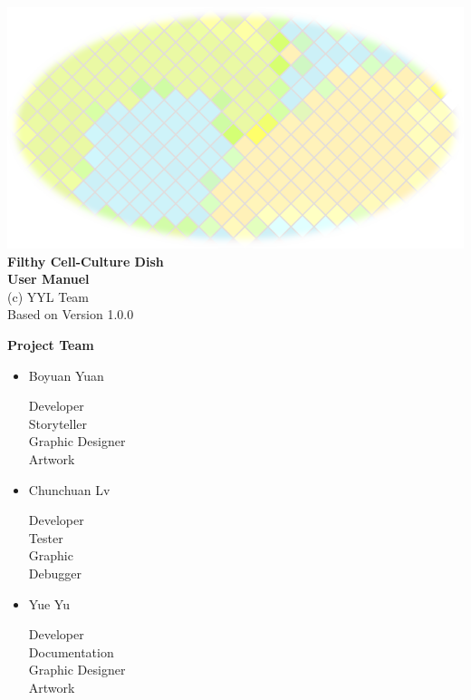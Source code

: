 \documentclass[12pt,a4paper,twoside]{scrartcl}
\date{}
\begin{document}
\begin{center}
\thispagestyle{empty}
\vfill
\includegraphics[scale=1]{title2}
\vfill
\huge
	\textbf{Filthy Cell-Culture Dish\\
	User Manuel\\}
\vfill
\large
	(c) YYL Team\\
	Based on Version 1.0.0
\vfill
\end{center}

\clearpage

\large
\textbf{Project Team}
\begin{itemize}
	\item Boyuan Yuan
	\begin{flushright}
		Developer\\
		Storyteller\\
		Graphic Designer\\
		Artwork\\
	\end{flushright}
	
	\item Chunchuan Lv
	\begin{flushright}	
		Developer\\
		Tester\\
		Graphic\\
		Debugger\\
	\end{flushright}
	
	\item Yue Yu
	\begin{flushright}
		Developer\\
		Documentation\\
		Graphic Designer\\
		Artwork\\
	\end{flushright}
\end{itemize}
\clearpage
\end{document}
